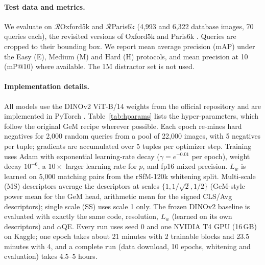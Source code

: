 \documentclass[runningheads]{llncs}
\newcommand{\roxf}{$\mathcal{R}$Oxford5k}
\newcommand{\rpar}{$\mathcal{R}$Paris6k}
\newcommand{\aqe}{$\alpha$QE}
\begin{document}
\paragraph{Test data and metrics.}
We evaluate on \roxf{} and \rpar{} \cite{radenovic2018revisiting}
(4,993 and 6,322 database images, 70 queries each), the revisited versions of
Oxford5k \cite{philbin2007oxford} and Paris6k \cite{philbin2008paris}. Queries
are cropped to their bounding box. We report mean average precision (mAP) under
the Easy (E), Medium (M) and Hard (H) protocols, and mean precision at 10
(mP@10) where available. The 1M distractor set is not used.

\paragraph{Implementation details.}
All models use the DINOv2 ViT-B/14 weights from the official repository
\cite{oquab2024dinov2} and are implemented in PyTorch \cite{paszke2019pytorch}.
Table~\ref{tab:hparams} lists the hyper-parameters, which follow the original
GeM recipe wherever possible. Each epoch re-mines hard negatives for 2,000
random queries from a pool of 22,000 images, with 5 negatives per tuple;
gradients are accumulated over 5 tuples per optimizer step. Training uses
Adam \cite{kingma2015adam} with exponential learning-rate decay
($\gamma=e^{-0.01}$ per epoch), weight decay $10^{-6}$, a $10\times$ larger
learning rate for $p$, and fp16 mixed precision. $L_w$ is learned on 5,000
matching pairs from the rSfM-120k whitening split. Multi-scale (MS)
descriptors average the descriptors at scales $\{1, 1/\sqrt2, 1/2\}$ (GeM-style
power mean for the GeM head, arithmetic mean for the signed CLS/Avg
descriptors); single scale (SS) uses scale 1 only. The frozen DINOv2 baseline
is evaluated with exactly the same code, resolution, $L_w$ (learned on its own
descriptors) and \aqe{}. Every run uses seed 0 and
one NVIDIA T4 GPU (16\,GB) on Kaggle; one epoch takes about 21 minutes with 2
trainable blocks and 23.5 minutes with 4, and a complete run (data download,
10 epochs, whitening and evaluation) takes 4.5--5 hours.
\end{document}
